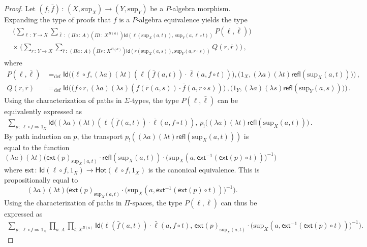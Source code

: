 \documentclass[10pt,a4paper,oneside,reqno]{amsart}
\theoremstyle{mythm}
\theoremstyle{mydef}
\theoremstyle{myrmk}
\newcommand{\defeq}{=_{\mathrm{def}}}
\newcommand{\co}{\,{:}\,}
\newcommand{\com}{\circ}
\newcommand{\ct}{\cdot}
\newcommand{\Hot}{\mathsf{Hot}}
\newcommand{\ext}{\mathsf{ext}}
\newcommand{\Id}{\mathsf{Id}}
\newcommand{\refl}{\mathsf{refl}}
\renewcommand{\sup}{\mathrm{sup}}
\begin{document}
\begin{proof} Let $(f, \bar{f}) \co (X, \sup_X) \to (Y, \sup_Y)$ be a  $P$-algebra morphism. Expanding the type of proofs that $f$ is a 
$P$-algebra equivalence yields the type
\begin{multline*}
 \Big(
	 \sum_{\ell \co Y \to X} \sum_{\bar{\ell} \co  (\Pi a \co A)( \Pi t \co X^{B(a)}) \Id( \ell (\sup_X(a,t)) ,\, \sup_Y(a, \ell \circ t))}
 		P(\ell, \bar{\ell})
		\Big) \\
\times\ \Big(
	\sum_{r \co Y \to X} \sum_{\bar{r} \co (\Pi a\co A) (\Pi s \co X^{B(a)}) \Id( r(\sup_X(a,s)), \sup_Y(a, r \circ s))}
		Q(r, \bar{r})  
		\Big)\, , 
\end{multline*}
where
\begin{align*}
P(\ell,\bar{\ell}) & \defeq \Id \Big( \big( \ell \com f, (\lambda a)(\lambda t) (\ell(\bar{f}(a,t)) \ct \bar{\ell}(a, f \com t))\big), \big( 1_X, (\lambda a)(\lambda t) \refl(\sup_X(a,t))\big) \Big)  \, , \\
Q(r,\bar{r})    & \defeq \Id \Big( \big( f \com r, (\lambda a)(\lambda s) (f(\bar{r}(a,s)) \ct \bar{f}(a, r \com s))\big) \, , \big( 1_Y, (\lambda a)(\lambda s) \refl(\sup_Y(a,s)) \big) \Big) \, .
\end{align*}
Using the characterization of paths in $\Sigma$-types, the type $P(\ell,\bar{\ell})$ can be equivalently expressed as
\begin{align*}
\sum_{ p \co \ell \com f \Rightarrow 1{_X}} 
	\Id\big((\lambda a) (\lambda t) (\ell(\bar{f}(a,t)) \ct \bar{\ell}(a, f \com t)) ,\, p_{!}((\lambda a) (\lambda t) \refl(\sup_X(a,t)) \big) \,.
\end{align*}
By path induction on $p$, the transport $p_{!} ((\lambda a) (\lambda t) \refl(\sup_X(a,t)))$ is equal to the function
\[ (\lambda a) (\lambda t) \big( \ext(p)_{\sup_X(a,t)} \ct \refl(\sup_X(a,t)) \ct \big(\sup_X(a, \ext^{-1}(\ext(p) \circ t))\big)^{-1}\big) \]
where $\ext \co \Id(\ell \com f ,1_X ) \to \Hot(\ell \com f , 1_X )$ is the canonical equivalence. 
This is propositionally equal to
\[ (\lambda a)(\lambda t)\big( \ext(p)_{\sup_X(a,t)} \ct \big(\sup_X(a, \ext^{-1}(\ext(p) \circ t))\big)^{-1}\big) .\]
Using the characterization of paths in $\Pi$-spaces, the type $P(\ell,\bar{\ell})$ can thus be expressed as
\begin{align*}
\sum_{ p \co \ell \com f \Rightarrow 1{_X}} \prod_{a:A} \prod_{t: X^{B(a)}} 
	\Id\Big(\ell(\bar{f}(a,t)) \ct \bar{\ell}(a, f \com t),\, \ext(p)_{\sup_X(a,t)} \ct \big(\sup_X(a, \ext^{-1}(\ext(p) \circ t))\big)^{-1}\Big).

\end{align*}
\end{proof}
\end{document}
